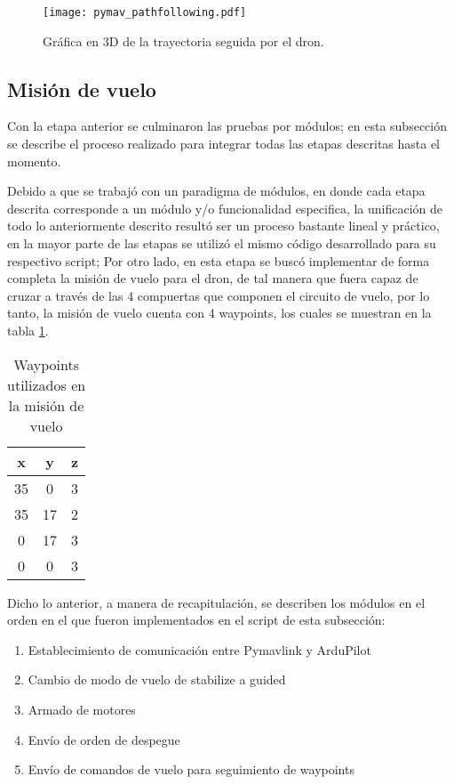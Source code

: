 \begin{figure}[ht]
    \centering
    \texttt{[image: pymav\_pathfollowing.pdf]}
    \caption{Gráfica en 3D de la trayectoria seguida por el dron.}
    \label{fig:pymav_pathfollowing}
\end{figure}

\subsection{Misión de vuelo}

Con la etapa anterior se culminaron las pruebas por módulos; en esta subsección se describe el proceso realizado para integrar todas las etapas descritas hasta el momento.

Debido a que se trabajó con un paradigma de módulos, en donde cada etapa descrita corresponde a un módulo y/o funcionalidad especifica, la unificación de todo lo anteriormente descrito resultó ser un proceso bastante lineal y práctico, en la mayor parte de las etapas se utilizó el mismo código desarrollado para su respectivo script; Por otro lado, en esta etapa se buscó implementar de forma completa la misión de vuelo para el dron, de tal manera que fuera capaz de cruzar a través de las 4 compuertas que componen el circuito de vuelo, por lo tanto, la misión de vuelo cuenta con 4 waypoints, los cuales se muestran en la tabla \ref{tab:waypoints_mission}.

\begin{table}[ht]
    \centering
    \begin{tabular}{ccc}
        \hline
        x & y & z\\
        \hline
        35 & 0 & 3\\
        35 & 17 & 2\\
        0 & 17 & 3\\
        0 & 0 & 3\\
        \hline
    \end{tabular}
    \caption{Waypoints utilizados en la misión de vuelo}
    \label{tab:waypoints_mission}
\end{table}


Dicho lo anterior, a manera de recapitulación, se describen los módulos en el orden en el que fueron implementados en el script de esta subsección:

\begin{enumerate}
    \item Establecimiento de comunicación entre Pymavlink y ArduPilot
    \item Cambio de modo de vuelo de stabilize a guided
    \item Armado de motores
    \item Envío de orden de despegue
    \item Envío de comandos de vuelo para seguimiento de waypoints
\end{enumerate}

